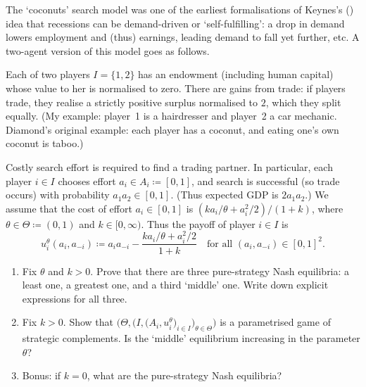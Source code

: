 \begin{exercise}
	\label{exercise:diamond_mcs}
	The \textcite{Diamond1982} `coconuts' search model was one of the earliest formalisations of Keynes's (\citeyear{Keynes1936}) idea that recessions can be demand-driven or `self-fulfilling': a drop in demand lowers employment and (thus) earnings, leading demand to fall yet further, etc. A two-agent version of this model \parencite[based on][section~4]{MilgromRoberts1990} goes as follows.

	Each of two players $I = \{1,2\}$ has an endowment (including human capital) whose value to her is normalised to zero. There are gains from trade: if players trade, they realise a strictly positive surplus normalised to $2$, which they split equally. (My example: player~1 is a hairdresser and player~2 a car mechanic. Diamond's original example: each player has a coconut, and eating one's own coconut is taboo.)

	Costly search effort is required to find a trading partner. In particular, each player $i \in I$ chooses effort $a_i \in A_i \coloneqq [0,1]$, and search is successful (so trade occurs) with probability $a_1 a_2 \in [0,1]$. (Thus expected GDP is $2 a_1 a_2$.) We assume that the cost of effort $a_i \in [0,1]$ is $\left( k a_i / \theta + a_i^2/2 \right) / (1+k)$, where $\theta \in \Theta \coloneqq (0,1)$ and $k \in [0,\infty)$. Thus the payoff of player $i \in I$ is
	\begin{equation*}
		u_i^\theta(a_i,a_{-i})
		\coloneqq a_i a_{-i}
		- \frac{ k a_i / \theta + a_i^2/2 }{1+k}
		\quad \text{for all $(a_i,a_{-i}) \in [0,1]^2$.}
	\end{equation*}

	\begin{enumerate}[label=(\alph*)]
	
		\item Fix $\theta$ and $k > 0$. Prove that there are three pure-strategy Nash equilibria: a least one, a greatest one, and a third `middle' one. Write down explicit expressions for all three.

		\item Fix $k > 0$. Show that $\bigl( \Theta, \bigl( I,\bigl(A_i,u_i^\theta\bigr)_{i \in I} \bigr)_{\theta \in \Theta} \bigr)$ is a parametrised game of strategic complements. Is the `middle' equilibrium increasing in the parameter $\theta$?

		\item Bonus: if $k=0$, what are the pure-strategy Nash equilibria?
	
	\end{enumerate}
\end{exercise}



